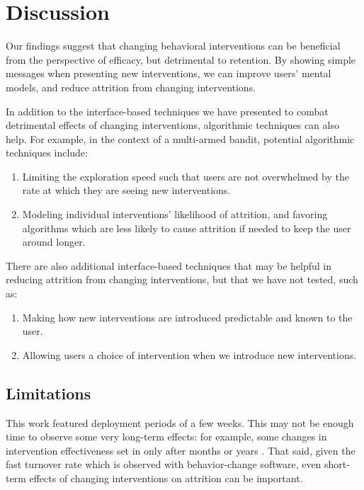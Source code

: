 \section{Discussion}


Our findings suggest that changing behavioral interventions can be beneficial from the perspective of efficacy, but detrimental to retention. By showing simple messages when presenting new interventions, we can improve users' mental models, and reduce attrition from changing interventions.

In addition to the interface-based techniques we have presented to combat detrimental effects of changing interventions, algorithmic techniques can also help. For example, in the context of a multi-armed bandit, potential algorithmic techniques include:

\begin{enumerate}
\item Limiting the exploration speed such that users are not overwhelmed by the rate at which they are seeing new interventions.
\item Modeling individual interventions' likelihood of attrition, and favoring algorithms which are less likely to cause attrition if needed to keep the user around longer.
\end{enumerate}

There are also additional interface-based techniques that may be helpful in reducing attrition from changing interventions, but that we have not tested, such as:

\begin{enumerate}
\item Making how new interventions are introduced predictable and known to the user.
\item Allowing users a choice of intervention when we introduce new interventions.
\end{enumerate}



\subsection{Limitations}
This work featured deployment periods of a few weeks.  This may not be enough time to observe some very long-term effects: for example, some changes in intervention effectiveness set in only after months or years \cite{krebs2010meta}. That said, given the fast turnover rate which is observed with behavior-change software, even short-term effects of changing interventions on attrition can be important.

